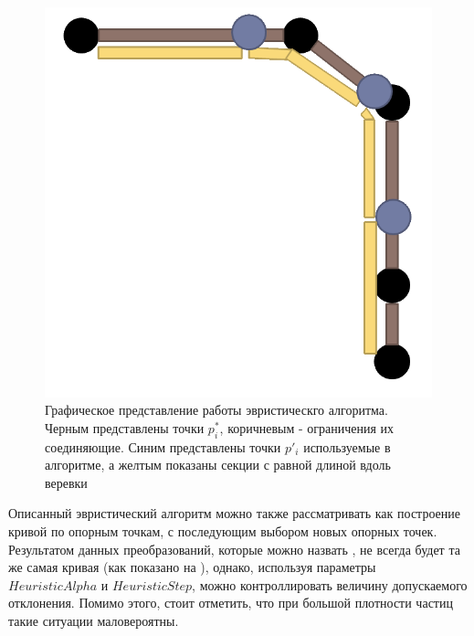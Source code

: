 	\begin{figure}[ht!] 
		\center
		\includegraphics [scale=0.3] {my_folder/images//heuristicSchema}
		\caption{Графическое представление работы эвристическго алгоритма. Черным представлены точки $p^*_i$, коричневым - ограничения их соединяющие. Синим представлены точки $p'_i$ используемые в алгоритме, а желтым показаны секции с равной длиной вдоль веревки}
		\label{fig:heuristicSchema}  
	\end{figure}	
	\FloatBarrier 
	
	Описанный эвристический алгоритм можно также рассматривать как построение кривой по опорным точкам, с последующим выбором новых опорных точек. Результатом данных преобразований, которые можно назвать , не всегда будет та же самая кривая (как показано на ), однако, используя параметры $HeuristicAlpha$ и $HeuristicStep$, можно контроллировать величину допускаемого отклонения. Помимо этого, стоит отметить, что при большой плотности частиц такие ситуации маловероятны.
	
